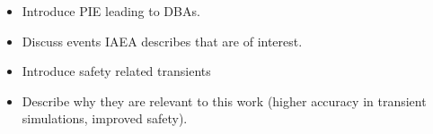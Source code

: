 \begin{itemize}
    \item Introduce \gls{PIE} leading to \glspl{DBA}.
    \item Discuss events \gls{IAEA} describes that are of interest.
    \item Introduce safety related transients
    \item Describe why they are relevant to this work (higher accuracy in transient simulations, improved safety).
\end{itemize}